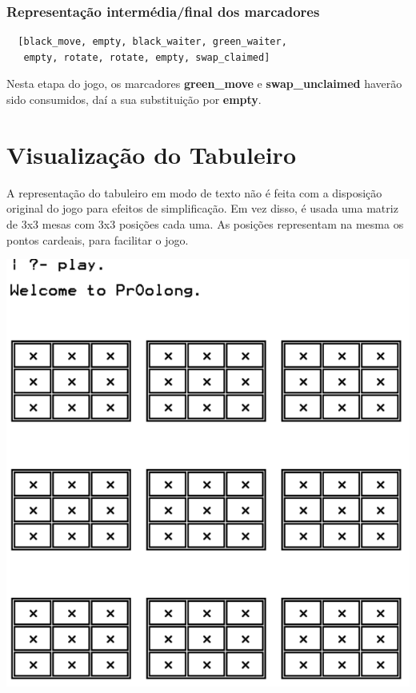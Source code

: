 \documentclass[a4paper]{article}
\begin{document}
\subsubsection{Representação intermédia/final dos marcadores}
\begin{lstlisting}
  [black_move, empty, black_waiter, green_waiter, 
   empty, rotate, rotate, empty, swap_claimed]
\end{lstlisting}

Nesta etapa do jogo, os marcadores \textbf{green\_move} e \textbf{swap\_unclaimed} haverão sido consumidos, daí a sua substituição por \textbf{empty}. \newline


\section{Visualização do Tabuleiro}

A representação do tabuleiro em modo de texto não é feita com a disposição original do jogo para efeitos de simplificação. Em vez disso, é usada uma matriz de 3x3 mesas com 3x3 posições cada uma. As posições representam na mesma os pontos cardeais, para facilitar o jogo.

\begin{center}
\includegraphics[scale=0.33]{tabuleiro.png}
\end{center}
\end{document}
